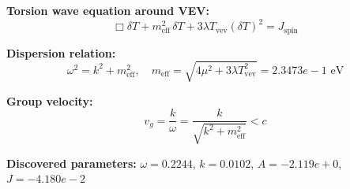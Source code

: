 
\textbf{Torsion wave equation around VEV:}
\begin{equation}
  \Box \delta T + m_{\text{eff}}^2 \, \delta T + 3\lambda T_{\text{vev}} (\delta T)^2 = J_{\text{spin}}
\end{equation}

\textbf{Dispersion relation:}
\begin{equation}
  \omega^2 = k^2 + m_{\text{eff}}^2, \quad
  m_{\text{eff}} = \sqrt{4\mu^2 + 3\lambda T_{\text{vev}}^2} = 2.3473e-1 \text{ eV}
\end{equation}

\textbf{Group velocity:}
\begin{equation}
  v_g = \frac{k}{\omega} = \frac{k}{\sqrt{k^2 + m_{\text{eff}}^2}} < c
\end{equation}

\textbf{Discovered parameters:}
$\omega = 0.2244$, \quad
$k = 0.0102$, \quad
$A = -2.119e+0$, \quad
$J = -4.180e-2$